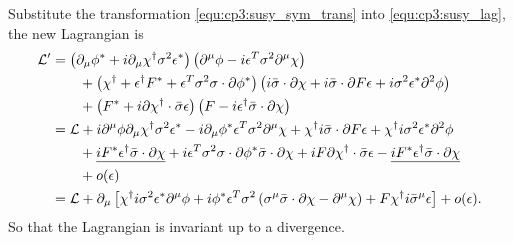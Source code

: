 \solution
\begin{problembody}
    \item Substitute the transformation \eqref{equ:cp3:susy_sym_trans} into \eqref{equ:cp3:susy_lag}, the new Lagrangian is 
    \begin{align*}
        \mathcal{L}' & = \left(\partial_\mu\phi^\ast + i\partial_\mu\chi^\dagger\sigma^2\epsilon^\ast\right)
        \left(\partial^\mu\phi - i\epsilon^T\sigma^2\partial^\mu\chi\right)\\
        & \qquad + \left(\chi^\dagger + \epsilon^\dagger F^\ast + \epsilon^T\sigma^2\sigma\cdot\partial\phi^\ast \right)
        \left(i\bar{\sigma}\cdot\partial\chi + i\bar{\sigma}\cdot\partial F\epsilon + i\sigma^2\epsilon^\ast\partial^2\phi\right)\\
        & \qquad + \left(F^\ast + i\partial\chi^\dagger\cdot\bar{\sigma}\epsilon\right)
        \left(F - i\epsilon^\dagger\bar{\sigma}\cdot\partial\chi\right)\\
        & = \mathcal{L} + i\partial^\mu\phi\partial_\mu\chi^\dagger\sigma^2\epsilon^\ast
        - i\partial_\mu\phi^\ast\epsilon^T\sigma^2\partial^\mu\chi
        + \chi^\dagger i\bar{\sigma}\cdot\partial F\epsilon
        + \chi^\dagger i\sigma^2\epsilon^\ast\partial^2\phi\\
        & \qquad + \underline{iF^\ast\epsilon^\dagger\bar{\sigma}\cdot\partial\chi}
        + i\epsilon^T\sigma^2\sigma\cdot\partial\phi^\ast\bar{\sigma}\cdot\partial\chi
        + iF\partial\chi^\dagger\cdot\bar{\sigma}\epsilon
        - \underline{iF^\ast\epsilon^\dagger\bar{\sigma}\cdot\partial\chi}\\
        & \qquad + o(\epsilon)\\
        & = \mathcal{L} + \partial_\mu \left[
            \chi^\dagger i\sigma^2\epsilon^\ast\partial^\mu\phi
            + i\phi^\ast\epsilon^T\sigma^2 \left(
                \sigma^\mu\bar{\sigma}\cdot\partial\chi
                - \partial^\mu\chi
            \right)
            + F\chi^\dagger i\bar{\sigma}^\mu\epsilon
        \right] + o(\epsilon).
    \end{align*}
    So that the Lagrangian is invariant up to a divergence.


\end{problembody}
